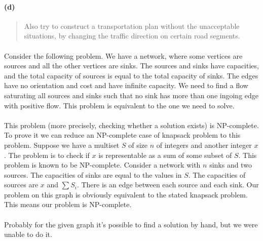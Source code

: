 \paragraph{(d)}
\begin{quote}
Also try to construct a transportation plan without the unacceptable situations, by changing the traffic direction on certain road segments.
\end{quote}

\paragraph{}
Consider the following problem. We have a network, where some vertices are sources and all the other vertices are sinks. The sources and sinks have capacities, and the total capacity of sources is equal to the total capacity of sinks. The edges have no orientation and cost and have infinite capacity. We need to find a flow saturating all sources and sinks such that no sink has more than one ingoing edge with positive flow. This problem is equivalent to the one we need to solve.

\paragraph{}
This problem (more precisely, checking whether a solution exists) is NP-complete. To prove it we can reduce an NP-complete case of knapsack problem to this problem. Suppose we have a multiset $S$ of size $n$ of integers and another integer $x$. The problem is to check if $x$ is representable as a sum of some subset of $S$. This problem is known to be NP-complete. Consider a network with $n$ sinks and two sources. The capacities of sinks are equal to the values in $S$. The capacities of sources are $x$ and $\sum S_i$. There is an edge between each source and each sink. Our problem on this graph is obviously equivalent to the stated knapsack problem. This means our problem is NP-complete.

\paragraph{}
Probably for the given graph it's possible to find a solution by hand, but we were unable to do it.
